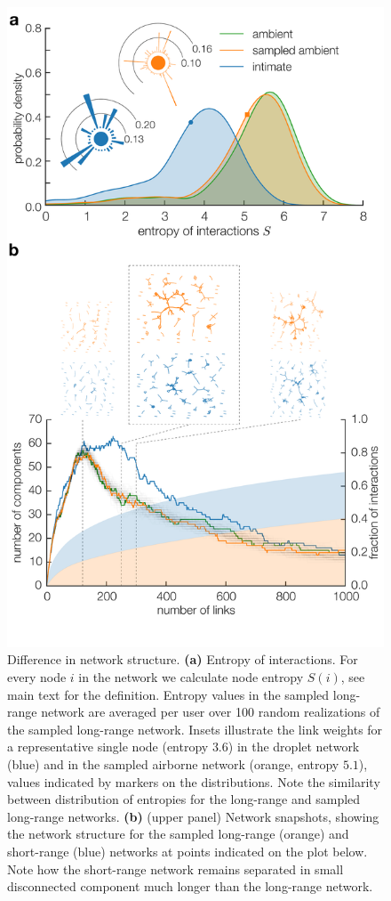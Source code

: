 \documentclass[fleqn,10pt]{wlscirep}
\begin{document}
\begin{figure}
\begin{center}
\includegraphics[width=.5\hsize]{panel_2_v2}
\end{center}
\caption{Difference in network structure.
%
\textbf{(a)} Entropy of interactions. For every node $i$ in the network we calculate node entropy $S(i)$, see main text for the definition. Entropy values in the sampled long-range network are averaged per user over 100 random realizations of the sampled long-range network. Insets illustrate the link weights for a representative single node (entropy $3.6$) in the droplet network (blue) and in the sampled airborne network (orange, entropy $5.1$), values indicated by markers on the distributions. Note the similarity between distribution of entropies for the long-range and sampled long-range networks.
%
\textbf{(b)} (upper panel) Network snapshots, showing the network structure for the sampled long-range (orange) and short-range (blue) networks at points indicated on the plot below. Note how the short-range network remains separated in small disconnected component much longer than the long-range network.
%
}
\end{figure}
\end{document}
